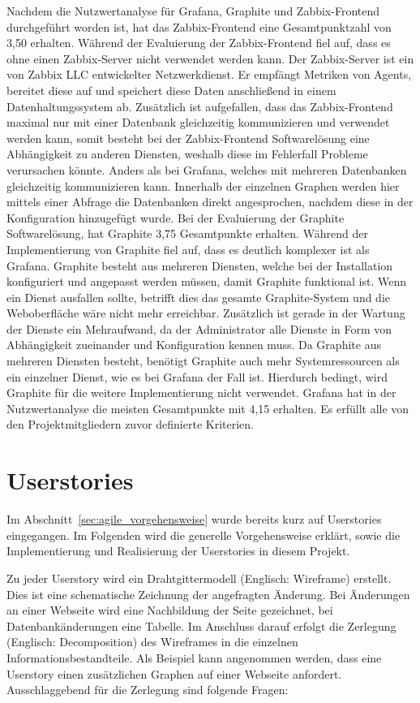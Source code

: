 {Nachdem die Nutzwertanalyse für Grafana, Graphite und Zabbix-Frontend
durchgeführt worden ist, hat das Zabbix\hyp{}Frontend eine Gesamtpunktzahl von 3,50
erhalten. Während der Evaluierung der Zabbix-Frontend fiel auf, dass es ohne
einen Zabbix-Server nicht verwendet werden kann. Der Zabbix-Server ist ein von
Zabbix LLC entwickelter Netzwerkdienst. Er empfängt Metriken von Agents,
bereitet diese auf und speichert diese Daten anschließend in einem
Datenhaltungssystem ab. Zusätzlich ist aufgefallen, dass das Zabbix-Frontend
maximal nur mit einer Datenbank gleichzeitig kommunizieren und verwendet werden
kann, somit besteht bei der Zabbix-Frontend Softwarelösung eine Abhängigkeit zu
anderen Diensten, weshalb diese im Fehlerfall Probleme verursachen könnte.
Anders als bei Grafana, welches mit mehreren Datenbanken gleichzeitig
kommunizieren kann. Innerhalb der einzelnen Graphen werden hier mittels einer
Abfrage die Datenbanken direkt angesprochen, nachdem diese in der Konfiguration
hinzugefügt wurde. Bei der Evaluierung der Graphite Softwarelösung, hat
Graphite 3,75 Gesamtpunkte erhalten. Während der Implementierung von Graphite
fiel auf, dass es deutlich komplexer ist als Grafana. Graphite besteht aus
mehreren Diensten, welche bei der Installation konfiguriert und angepasst
werden müssen, damit Graphite funktional ist. Wenn ein Dienst ausfallen sollte,
 betrifft dies das gesamte Graphite-System und die Weboberfläche wäre nicht
mehr erreichbar. Zusätzlich ist gerade in der Wartung der Dienste ein
Mehraufwand, da der Administrator alle Dienste in Form von Abhängigkeit
zueinander und Konfiguration kennen muss. Da Graphite aus mehreren Diensten
besteht, benötigt Graphite auch mehr Systemressourcen als ein einzelner Dienst,
wie es bei Grafana der Fall ist. Hierdurch bedingt, wird Graphite für die
weitere Implementierung nicht verwendet. Grafana hat in der Nutzwertanalyse die
meisten Gesamtpunkte mit 4,15 erhalten. Es erfüllt alle von den
Projektmitgliedern zuvor definierte Kriterien.
\mr%

\chapter{Userstories}
Im Abschnitt~\ref{sec:agile_vorgehensweise} wurde bereits kurz auf Userstories
eingegangen. Im Folgenden wird die generelle Vorgehensweise erklärt, sowie die
Implementierung und Realisierung der Userstories in diesem Projekt.

Zu jeder Userstory wird ein Drahtgittermodell (Englisch: Wireframe) erstellt.
Dies ist eine schematische Zeichnung der angefragten Änderung. Bei Änderungen
an einer Webseite wird eine Nachbildung der Seite gezeichnet, bei
Datenbankänderungen eine Tabelle. Im Anschluss darauf erfolgt die Zerlegung
(Englisch: Decomposition) des Wireframes in die einzelnen
Informationsbestandteile. Als Beispiel kann angenommen werden, dass eine
Userstory einen zusätzlichen Graphen auf einer Webseite anfordert.
Ausschlaggebend für die Zerlegung sind folgende Fragen:

}

